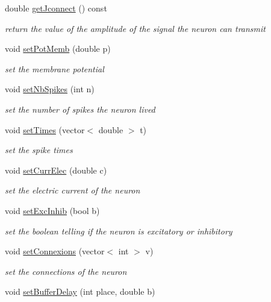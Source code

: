 \begin{DoxyCompactItemize}
double \hyperlink{classNeuron_a33a5eec13c1431b19cd4c9fc1bb02c0d}{get\-Jconnect} () const 
\begin{DoxyCompactList}\small\item\em return the value of the amplitude of the signal the neuron can transmit \end{DoxyCompactList}\item 
void \hyperlink{classNeuron_a39a86229bfac42c2e9ebbb91dd8655e8}{set\-Pot\-Memb} (double p)
\begin{DoxyCompactList}\small\item\em set the membrane potential \end{DoxyCompactList}\item 
void \hyperlink{classNeuron_afd39ff97179ef4f074653f024b69b610}{set\-Nb\-Spikes} (int n)
\begin{DoxyCompactList}\small\item\em set the number of spikes the neuron lived \end{DoxyCompactList}\item 
void \hyperlink{classNeuron_a46444e31c0b2cda937344b0a41ff59da}{set\-Times} (vector$<$ double $>$ t)
\begin{DoxyCompactList}\small\item\em set the spike times \end{DoxyCompactList}\item 
void \hyperlink{classNeuron_afe93c4d6b087e5d16220e0c0550fce01}{set\-Curr\-Elec} (double c)
\begin{DoxyCompactList}\small\item\em set the electric current of the neuron \end{DoxyCompactList}\item 
void \hyperlink{classNeuron_a47ee8e3d16f88abf78bee5a399f4a2be}{set\-Exc\-Inhib} (bool b)
\begin{DoxyCompactList}\small\item\em set the boolean telling if the neuron is excitatory or inhibitory \end{DoxyCompactList}\item 
void \hyperlink{classNeuron_ad5f0c6229057cd544d3828f15ae527a7}{set\-Connexions} (vector$<$ int $>$ v)
\begin{DoxyCompactList}\small\item\em set the connections of the neuron \end{DoxyCompactList}\item 
void \hyperlink{classNeuron_a666ab405d0710b81a0bb5167269bb2b8}{set\-Buffer\-Delay} (int place, double b)

\end{DoxyCompactItemize}
